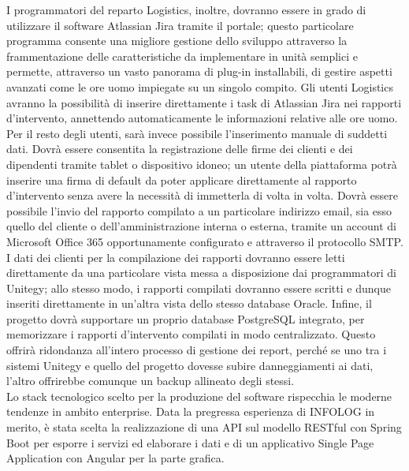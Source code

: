I programmatori del reparto Logistics, inoltre, dovranno essere in grado di utilizzare il software Atlassian Jira tramite il portale;
questo particolare programma consente una migliore gestione dello sviluppo attraverso la frammentazione delle caratteristiche da implementare in unità semplici e permette, attraverso
un vasto panorama di plug-in installabili, di gestire aspetti avanzati come le ore uomo impiegate su un singolo compito.
Gli utenti Logistics avranno la possibilità di inserire direttamente i task di Atlassian Jira nei rapporti d'intervento, annettendo automaticamente le informazioni relative alle ore uomo.
Per il resto degli utenti, sarà invece possibile l'inserimento manuale di suddetti dati.
Dovrà essere consentita la registrazione delle firme dei clienti e dei dipendenti tramite tablet o dispositivo idoneo; un utente della piattaforma potrà inserire una firma di default
da poter applicare direttamente al rapporto d'intervento senza avere la necessità di immetterla di volta in volta.
Dovrà essere possibile l'invio del rapporto compilato a un particolare indirizzo email, sia esso quello del cliente o dell'amministrazione interna o esterna, tramite un account di
Microsoft Office 365 opportunamente configurato e attraverso il protocollo SMTP.
I dati dei clienti per la compilazione dei rapporti dovranno essere letti direttamente da una particolare vista messa a disposizione dai programmatori di Unitegy; allo stesso modo, 
i rapporti compilati dovranno essere scritti e dunque inseriti direttamente in un'altra vista dello stesso database Oracle.
Infine, il progetto dovrà supportare un proprio database PostgreSQL integrato, per memorizzare i rapporti d'intervento compilati in modo centralizzato.
Questo offrirà ridondanza all'intero processo di gestione dei report, perché se uno tra i sistemi Unitegy e quello del progetto dovesse subire danneggiamenti ai dati, l'altro
offrirebbe comunque un backup allineato degli stessi.
\\
Lo stack tecnologico scelto per la produzione del software rispecchia le moderne tendenze in ambito enterprise.
Data la pregressa esperienza di INFOLOG in merito, è stata scelta la realizzazione di una API sul modello RESTful con Spring Boot per esporre i servizi ed elaborare i dati
e di un applicativo Single Page Application con Angular per la parte grafica.